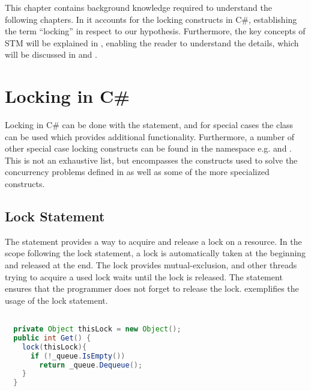 \makeatletter {}\makeatother
{}
This chapter contains background knowledge required to understand the following chapters. In  it accounts for the locking constructs in C\#, establishing the term ``locking''  in respect to our hypothesis. Furthermore, the key concepts of \ac{STM} will be explained in , enabling the reader to understand the details, which will be discussed in  and .
\label{chap:prelim}
\section{Locking in C\#}\label{sec:locking}
Locking in C\# can be done with the  statement, and for special cases the  class can be used which provides additional functionality. Furthermore, a number of other special case locking constructs can be found in the  namespace e.g. \cite{microsoftSyncPrim}    and . This is not an exhaustive list, but encompasses the constructs used to solve the concurrency problems defined in  as well as some of the more specialized constructs.
\subsection{Lock Statement}\label{subsec:lock_statement}
The  statement\cite[p. 102]{csharp2013specificaiton} provides a way to acquire and release a lock on a resource. In the scope following the lock statement, a lock is automatically taken at the beginning and released at the end. The lock provides mutual-exclusion, and other threads trying to acquire a used lock waits until the lock is released. The  statement ensures that the programmer does not forget to release the lock.  exemplifies the usage of the lock statement. 
\begin{lstlisting}[label=lst:lock_statement,
  caption={Lock Statement},
  language=Java,  
  showspaces=false,
  showtabs=false,
  breaklines=true,
  showstringspaces=false,
  breakatwhitespace=true,
  commentstyle=\color{greencomments},
  keywordstyle=\color{bluekeywords},
  stringstyle=\color{redstrings},
  morekeywords={atomic, retry, orElse}]  % Start your code-block

  private Object thisLock = new Object();
  public int Get() { 
    lock(thisLock){
      if (!_queue.IsEmpty())
        return _queue.Dequeue();
    }
  }
\end{lstlisting}
